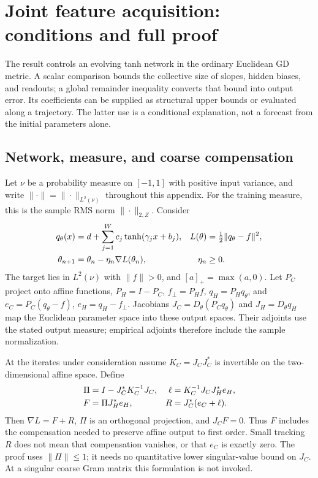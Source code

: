\section{Joint feature acquisition: conditions and full proof}
\label{app:feature-theory}

The result controls an evolving tanh network in the ordinary Euclidean GD
metric. A scalar comparison bounds the collective size of slopes, hidden
biases, and readouts; a global remainder inequality converts that bound
into output error. Its coefficients can be supplied as structural upper
bounds or evaluated along a trajectory. The latter use is a conditional
explanation, not a forecast from the initial parameters alone.

\subsection{Network, measure, and coarse compensation}
Let $\nu$ be a probability measure on $[-1,1]$ with positive input variance,
and write $\|\cdot\|=\|\cdot\|_{L^2(\nu)}$ throughout this appendix.
For the training measure, this is the sample RMS norm $\|\cdot\|_{2,Z}$.
Consider
\begin{align}
 q_\theta(x)&=d+\sum_{j=1}^W c_j\tanh(\gamma_jx+b_j),&
 L(\theta)&=\tfrac12\|q_\theta-f\|^2,\notag\\
 \theta_{n+1}&=\theta_n-\eta_n\nabla L(\theta_n),& \eta_n&\ge0.
 \label{eq:feature-network}
\end{align}
The target lies in $L^2(\nu)$ with $\|f\|>0$, and $[a]_+=\max(a,0)$.
Let $P_C$ project onto affine functions,
$P_H=I-P_C$, $f_\perp=P_Hf$, $q_H=P_Hq_\theta$, and
$e_C=P_C(q_\theta-f)$, $e_H=q_H-f_\perp$.
Jacobians $J_C=D_\theta(P_Cq_\theta)$ and $J_H=D_\theta q_H$ map the
Euclidean parameter space into these output spaces. Their adjoints use
the stated output measure; empirical adjoints therefore include the
sample normalization.

At the iterates under consideration assume $K_C=J_CJ_C^*$ is invertible
on the two-dimensional affine space. Define
\begin{align}
 \Pi&=I-J_C^*K_C^{-1}J_C,&
 \ell&=K_C^{-1}J_CJ_H^*e_H,\notag\\
 F&=\Pi J_H^*e_H,& R&=J_C^*(e_C+\ell).
 \label{eq:feature-split}
\end{align}
Then $\nabla L=F+R$, $\Pi$ is an orthogonal projection, and $J_CF=0$.
Thus $F$ includes the compensation needed to preserve affine output to
first order. Small tracking $R$ does not mean that compensation vanishes,
or that $e_C$ is exactly zero. The proof uses $\|\Pi\|\le1$;
it needs no quantitative lower singular-value bound on $J_C$.
At a singular coarse Gram matrix this formulation is not invoked.

